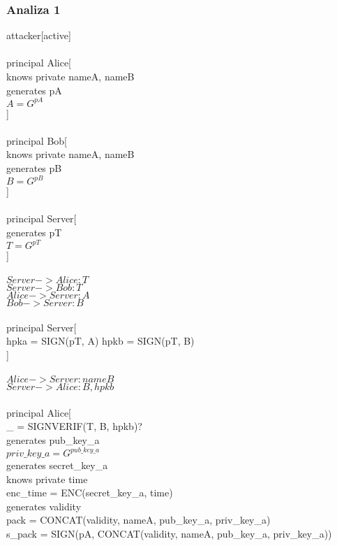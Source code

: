\documentclass[11pt]{article}
\begin{document}
\subsubsection{Analiza 1}
attacker[active]\\\\
principal Alice[\\
knows private nameA, nameB\\
generates pA\\
$A = G^{pA}$\\
]\\\\
principal Bob[\\
    knows private nameA, nameB\\
	generates pB\\
	$B = G^{pB}$\\
 ]\\\\
 principal Server[\\
	generates pT\\
	$T = G^{pT}$\\
 ]\\\\
 $Server -> Alice: T$\\
 $Server -> Bob: T$\\
 $Alice -> Server: A$\\
 $Bob -> Server: B$\\\\
principal Server[\\
	hpka = SIGN(pT, A)	hpkb = SIGN(pT, B)\\
 ]\\\\
$Alice -> Server: nameB$\\
 $Server -> Alice: B, hpkb$\\\\
 principal Alice[\\
	\_ = SIGNVERIF(T, B, hpkb)?\\
	generates pub\_key\_a\\
 	$priv\_key\_a = G^{pub\_key\_a}$\\
	generates secret\_key\_a\\
 	knows private time\\
	enc\_time = ENC(secret\_key\_a, time)\\	
	generates validity\\
	pack = CONCAT(validity, nameA, pub\_key\_a, priv\_key\_a)\\
	s\_pack = SIGN(pA, CONCAT(validity, nameA, pub\_key\_a, priv\_key\_a))\\
\end{document}
